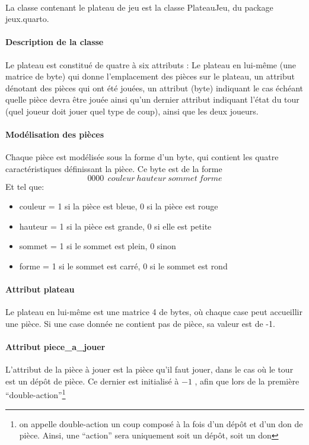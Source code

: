 \documentclass{article}
\begin{document}
\paragraph{}
La classe contenant le plateau de jeu est la classe PlateauJeu, du
package jeux.quarto.

\paragraph{Description de la classe}
Le plateau est constitué de quatre à six attributs : Le plateau en lui-même (une
matrice de byte) qui donne l'emplacement des pièces sur le plateau, 
un attribut dénotant des pièces qui ont été jouées, un attribut (byte)
indiquant le cas échéant quelle pièce devra être jouée ainsi qu'un dernier
attribut indiquant l'état du tour (quel joueur doit jouer quel type de
coup), ainsi que les deux joueurs.

\paragraph{Modélisation des pièces}
Chaque pièce est modélisée sous la forme d'un byte, qui contient les
quatre caractéristiques définissant la pièce. Ce byte est de la forme 
\[ 0000~~couleur~hauteur~sommet~forme \]
Et tel que:
\begin{itemize}
\item couleur = 1 si la pièce est bleue, 0 si la pièce est rouge
\item hauteur = 1 si la pièce est grande, 0 si elle est petite
\item sommet = 1 si le sommet est plein, 0 sinon
\item forme = 1 si le sommet est carré, 0 si le sommet est rond
\end{itemize}

\paragraph{Attribut plateau}
Le plateau en lui-même est une matrice 4  de bytes, o\`u
chaque case peut accueillir une pièce. Si une case donnée ne contient
pas de pièce, sa valeur est de -1.

\paragraph{Attribut piece\_a\_jouer}
L'attribut de la pièce à jouer est la pièce qu'il faut jouer, dans le
cas o\`u le tour est un dépôt de pièce. Ce dernier est initialisé à
\(-1\) , afin que lors de la première ``double-action''\footnote{ on
  appelle double-action un coup composé à la fois d'un dépôt et d'un
  don de pièce. Ainsi, une ``action'' sera uniquement soit un dépôt,
  soit un don}
\end{document}

